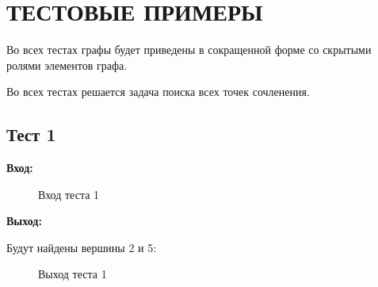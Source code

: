 \documentclass[a4paper]{article}
\begin{document}
\section{ТЕСТОВЫЕ ПРИМЕРЫ}

Во всех тестах графы будет приведены в сокращенной форме со скрытыми ролями элементов графа.\par
Во всех тестах решается задача поиска всех точек сочленения.

\subsection{Тест 1}

\textbf{Вход:}
  \begin{figure}[!h]
    \caption{Вход теста 1}
  \end{figure}
\par
\textbf{Выход:} \par
  Будут найдены вершины 2 и 5:
  \begin{figure}[!h]
    \caption{Выход теста 1}
  \end{figure}
\newpage
\end{document}
